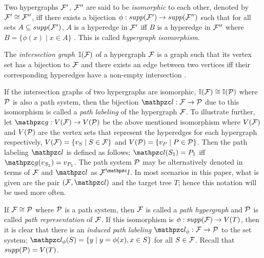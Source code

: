 \documentclass[MS]             %
              {iitmdiss_as}    %
\begin{document}
Two hypergraphs ${\cal F}'$, ${\cal F}''$ are said to be {\em
  isomorphic} to each other, denoted by ${\cal F}' \cong {\cal F}''$, iff there
exists a bijection $\phi: supp({\cal F}') \rightarrow supp({\cal F}'')$ such
that for all sets $A \subseteq supp({\cal F}')$, $A$ is a hyperedge in
${\cal F}'$ iff $B$ is a hyperedge in ${\cal F}''$ where $B = \{\phi(x) \mid x
\in A\}$ \cite{kklv10}. This is called {\em hypergraph
  isomorphism}. 


The {\em intersection graph}\, $\mathbb I({\cal F})$ of a hypergraph
${\cal F}$ is a graph such that its vertex set has a bijection to ${\cal F}$ and
there exists an edge between two vertices iff their corresponding
hyperedges have a non-empty intersection \cite{mcg04}.


If the intersection graphs of two hypergraphs are isomorphic, $\mathbb I({\cal F})
\cong \mathbb I({\cal P})$ where ${\cal P}$ is also a path system, then the bijection
$\cl: \cF \rightarrow \cP$ due to this isomorphism is called a {\em
  path labeling} of the hypergraph ${\cal F}$. To illustrate further, let
$\cg: V(\cF) \rightarrow V(\cP)$ be the above mentioned isomorphism
where $V({\cal F})$ and $V({\cal P})$ are the vertex sets that represent the
hyperedges for each hypergraph respectively, $V({\cal F}) = \{ v_S \mid S
\in {\cal F}\}$ and $V({\cal P}) = \{ v_P \mid P \in {\cal P}\}$. Then the path
labeling $\cl$ is defined as follows: $\cl(S_1) = P_1$ iff $\cg
(v_{S_1}) = v_{P_1}$. The path system ${\cal P}$ may be alternatively
denoted in terms of ${\cal F}$ and $\cl$ as $\cF^\cl$. In most scenarios in
this paper, what is given are the pair $(\cF, \cl)$ and the target
tree $T$; hence this notation will be used more often.

If ${\cal F} \cong {\cal P}$ where ${\cal P}$ is a path system, then ${\cal F}$
is called a {\em path hypergraph} and ${\cal P}$ is called {\em path
  representation} of ${\cal F}$. If this isomorphism is $\phi: supp({\cal F})
\rightarrow V(T)$, then it is clear that there is an {\em induced path
labeling} $\cl_\phi: \cF \rightarrow \cP$ to the set system;
$\cl_\phi(S) = \set{y \mid y = \phi(x), x \in S}$ for all $S \in {\cal F}$. Recall that
$supp({\cal P}) = V(T)$.


\end{document}
